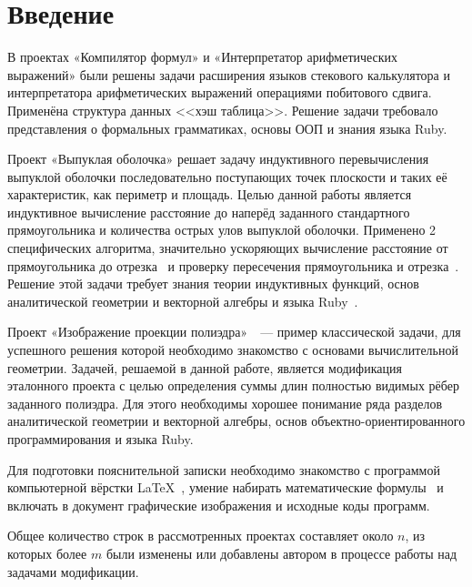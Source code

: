 \section{Введение}

В проектах «Компилятор формул» и «Интерпретатор арифметических
выражений» были решены задачи расширения языков стекового калькулятора
и интерпретатора арифметических выражений операциями побитового сдвига.
Применёна структура данных <<хэш таблица>>.
Решение задачи требовало представления о формальных грамматиках, основы ООП и
знания языка Ruby.

Проект «Выпуклая оболочка»\cite{convex} решает задачу индуктивного
перевычисления
выпуклой оболочки последовательно поступающих точек плоскости и таких её
характеристик, как периметр и площадь. Целью данной работы является
индуктивное вычисление расстояние до наперёд заданного стандартного прямоугольника
и количества острых улов выпуклой оболочки. Применено 2 специфических алгоритма,
значительно ускоряющих вычисление расстояние от прямоугольника до
отрезка~\cite{seginters} и проверку пересечения прямоугольника и 
отрезка~\cite{barsky}. Решение этой задачи требует знания
теории индуктивных функций, основ аналитической геометрии и векторной алгебры
и языка Ruby~\cite{ruby}.

Проект «Изображение проекции полиэдра»~\cite{polyedr}~--- пример
классической задачи, для успешного решения которой необходимо знакомство с
основами вычислительной геометрии. Задачей, решаемой в данной работе, является
модификация эталонного проекта с целью определения суммы длин полностью видимых
рёбер заданного полиэдра. Для этого необходимы хорошее понимание ряда разделов
аналитической геометрии и векторной алгебры, основ объектно-ориентированного
программирования и языка Ruby.

Для подготовки пояснительной записки необходимо знакомство с программой
компьютерной вёрстки \LaTeX~\cite{rlatex}, умение набирать математические
формулы~\cite{texbook} и включать в документ графические изображения и исходные
коды программ.

Общее количество строк в рассмотренных проектах составляет около $n$, из которых
более $m$ были изменены или добавлены автором в процессе работы
над задачами модификации.
